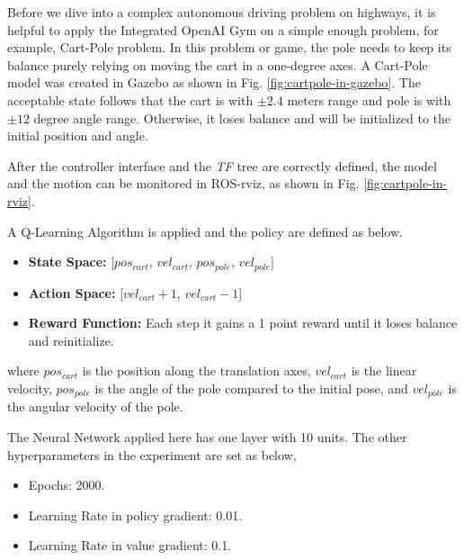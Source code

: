 Before we dive into a complex autonomous driving problem on highways, it is helpful to apply the Integrated OpenAI Gym on a simple enough problem, for example, Cart-Pole problem. In this problem or game, the pole needs to keep its balance purely relying on moving the cart in a one-degree axes. A Cart-Pole model was created in Gazebo as shown in Fig. \ref{fig:cartpole-in-gazebo}. The acceptable state follows that the cart is with $\pm 2.4$ meters range and pole is with $\pm 12$ degree angle range. Otherwise, it loses balance and will be initialized to the initial position and angle.

After the controller interface and the \textit{TF} tree are correctly defined, the model and the motion can be monitored in ROS-rviz, as shown in Fig. \ref{fig:cartpole-in-rviz}. 

A Q-Learning Algorithm is applied and the policy are defined as below.

\begin{itemize}
\item \textbf{State Space:} [$pos_{cart}$, $vel_{cart}$, $pos_{pole}$, $vel_{pole}$]

\item \textbf{Action Space:} [$vel_{cart} + 1$, $vel_{cart} - 1$]

\item \textbf{Reward Function:} Each step it gains a 1 point reward until it loses balance and reinitialize.
\end{itemize}

where $pos_{cart}$ is the position along the translation axes, $vel_{cart}$ is the linear velocity, $pos_{pole}$ is the angle of the pole compared to the initial pose,  and $vel_{pole}$ is the angular velocity of the pole.

The Neural Network applied here has one layer with 10 units. The other hyperparameters in the experiment are set as below,

\begin{itemize}
\item{Epochs:} 2000.
\item{Learning Rate in policy gradient:} 0.01.
\item{Learning Rate in value gradient:} 0.1.
\end{itemize}

